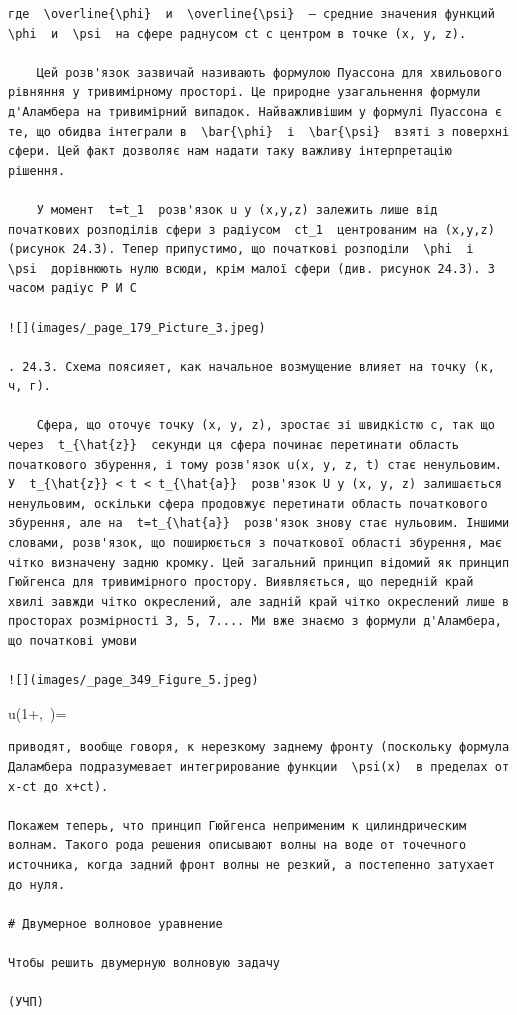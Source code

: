 \documentclass[
  ukrainian,
]{article}
\begin{document}
\begin{verbatim}
где  \overline{\phi}  и  \overline{\psi}  — средние значения функций  \phi  и  \psi  на сфере раднусом ct с центром в точке (x, y, z).

    Цей розв'язок зазвичай називають формулою Пуассона для хвильового рівняння у тривимірному просторі. Це природне узагальнення формули д'Аламбера на тривимірний випадок. Найважливішим у формулі Пуассона є те, що обидва інтеграли в  \bar{\phi}  і  \bar{\psi}  взяті з поверхні сфери. Цей факт дозволяє нам надати таку важливу інтерпретацію рішення.

    У момент  t=t_1  розв'язок u у (x,y,z) залежить лише від початкових розподілів сфери з радіусом  ct_1  центрованим на (x,y,z) (рисунок 24.3). Тепер припустимо, що початкові розподіли  \phi  і  \psi  дорівнюють нулю всюди, крім малої сфери (див. рисунок 24.3). З часом радіус P И С

![](images/_page_179_Picture_3.jpeg)

. 24.3. Схема поясияет, как начальное возмущение влияет на точку (к, ч, г).

    Сфера, що оточує точку (x, y, z), зростає зі швидкістю c, так що через  t_{\hat{z}}  секунди ця сфера починає перетинати область початкового збурення, і тому розв'язок u(x, y, z, t) стає ненульовим. У  t_{\hat{z}} < t < t_{\hat{a}}  розв'язок U у (x, y, z) залишається ненульовим, оскільки сфера продовжує перетинати область початкового збурення, але на  t=t_{\hat{a}}  розв'язок знову стає нульовим. Іншими словами, розв'язок, що поширюється з початкової області збурення, має чітко визначену задню кромку. Цей загальний принцип відомий як принцип Гюйгенса для тривимірного простору. Виявляється, що передній край хвилі завжди чітко окреслений, але задній край чітко окреслений лише в просторах розмірності 3, 5, 7.... Ми вже знаємо з формули д'Аламбера, що початкові умови

![](images/_page_349_Figure_5.jpeg)
\end{verbatim}

u\left(1+\sin\theta,~\theta\right)=\cos\theta

\begin{verbatim}
приводят, вообще говоря, к нерезкому заднему фронту (поскольку формула Даламбера подразумевает интегрирование функции  \psi(x)  в пределах от x-ct до x+ct).

Покажем теперь, что принцип Гюйгенса неприменим к цилиндрическим волнам. Такого рода решения описывают волны на воде от точечного источника, когда задний фронт волны не резкий, а постепенно затухает до нуля.

# Двумерное волновое уравнение

Чтобы решить двумерную волновую задачу

(УЧП)
\end{verbatim}
\end{document}
